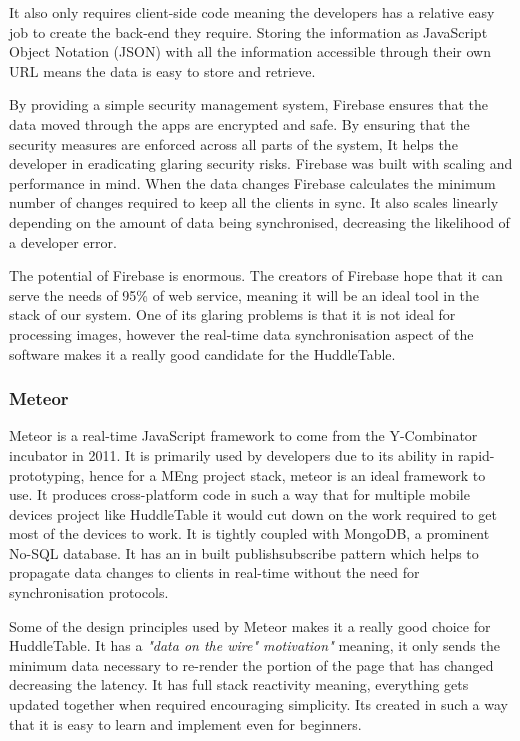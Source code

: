 It also only requires client-side code meaning the developers has
a relative easy job to create the back-end they require. Storing
the information as JavaScript Object Notation (JSON) with all the information accessible through
their own URL means the data is easy to store and retrieve.
 
By providing a simple security management system, Firebase ensures
that the data moved through the apps are encrypted and safe. By ensuring
that the security measures are enforced across all parts of the system,
It helps the developer in eradicating glaring security risks. Firebase was
built with scaling and performance in mind. When the data changes
Firebase calculates the minimum number of changes required to keep
all the clients in sync. It also scales linearly depending on the
amount of data being synchronised, decreasing the likelihood of a
developer error.
 
The potential of Firebase is enormous. The creators of Firebase hope
that it can serve the needs of 95\% of web service\cite{firebase-wired},
meaning it will be an ideal tool in the stack of our system. One of
its glaring problems is that it is not ideal for processing images,
however the real-time data synchronisation aspect of the software makes it a
really good candidate for the HuddleTable.
 
 
\subsubsection{Meteor}
 
Meteor\cite{meteor} is a real-time JavaScript framework to come from
the Y-Combinator incubator in 2011. It is primarily used by developers
due to its ability in rapid-prototyping, hence for a MEng project
stack, meteor is an ideal framework to use. It produces cross-platform
code in such a way that for multiple mobile devices project like HuddleTable
it would cut down on the work required to get most of the devices
to work. It is tightly coupled with MongoDB, a prominent No-SQL
database. It has an in built publish\textendash subscribe pattern\cite{pub-sub-pattern}
which helps to propagate data changes to clients in real-time without
the need for synchronisation protocols.
 
Some of the design principles used by Meteor makes it a really good
choice for HuddleTable. It has a \emph{"data on the wire" motivation"} meaning,
it only sends the minimum data necessary to re-render the portion
of the page that has changed decreasing the latency. It has full
stack reactivity\cite{meteor-wiki} meaning, everything gets updated
together when required encouraging simplicity. Its
created in such a way that it is easy to learn and implement even
for beginners.
 
